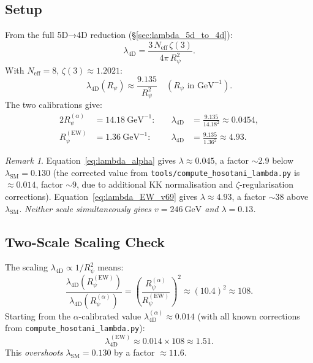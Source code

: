 \documentclass[12pt]{article}
\theoremstyle{definition}
\theoremstyle{remark}
\newtheorem{remark}[theorem]{Remark}
\begin{document}
\subsection{Setup}

From the full 5D→4D reduction (§\ref{sec:lambda_5d_to_4d}):
\begin{equation}
  \lambda_{\text{4D}} = \frac{3\,N_{\text{eff}}\,\zeta(3)}{4\pi\,R_\psi^2}.
  \label{eq:lambda_4d_rpsi}
\end{equation}
With $N_{\text{eff}} = 8$, $\zeta(3) \approx 1.2021$:
\begin{equation}
  \lambda_{\text{4D}}(R_\psi) \approx \frac{9.135}{R_\psi^2}
  \quad (R_\psi\text{ in GeV}^{-1}).
  \label{eq:lambda_scaling}
\end{equation}
The two calibrations give:
\begin{alignat}{2}
  R_\psi^{(\alpha)} &= 14.18~\text{GeV}^{-1}:
  &\quad
  \lambda_{\text{4D}} &= \frac{9.135}{14.18^2} \approx 0.0454,
  \label{eq:lambda_alpha}\\[4pt]
  R_\psi^{(\text{EW})} &= 1.36~\text{GeV}^{-1}:
  &\quad
  \lambda_{\text{4D}} &= \frac{9.135}{1.36^2} \approx 4.93.
  \label{eq:lambda_EW_v69}
\end{alignat}

\begin{remark}
Equation~\eqref{eq:lambda_alpha} gives $\lambda \approx 0.045$, a factor $\sim 2.9$
below $\lambda_{\text{SM}} = 0.130$ (the corrected value from
\texttt{tools/compute\_hosotani\_lambda.py} is $\approx 0.014$, factor $\sim 9$,
due to additional KK normalisation and $\zeta$-regularisation corrections).
Equation~\eqref{eq:lambda_EW_v69} gives $\lambda \approx 4.93$, a factor
$\sim 38$ above $\lambda_{\text{SM}}$.  \emph{Neither scale simultaneously
gives $v = 246\ \text{GeV}$ and $\lambda = 0.13$.}
\end{remark}

\subsection{Two-Scale Scaling Check}

The scaling $\lambda_{\text{4D}} \propto 1/R_\psi^2$ means:
\begin{equation}
  \frac{\lambda_{\text{4D}}(R_\psi^{(\text{EW})})}
       {\lambda_{\text{4D}}(R_\psi^{(\alpha)})}
  = \left(\frac{R_\psi^{(\alpha)}}{R_\psi^{(\text{EW})}}\right)^2
  \approx (10.4)^2 \approx 108.
  \label{eq:lambda_scale_ratio}
\end{equation}
Starting from the $\alpha$-calibrated value
$\lambda_{\text{4D}}^{(\alpha)} \approx 0.014$ (with all known corrections
from \texttt{compute\_hosotani\_lambda.py}):
\begin{equation}
  \lambda_{\text{4D}}^{(\text{EW})} \approx 0.014 \times 108 \approx 1.51.
  \label{eq:lambda_EW_scaled}
\end{equation}
This \emph{overshoots} $\lambda_{\text{SM}} = 0.130$ by a factor $\approx 11.6$.
\end{document}
